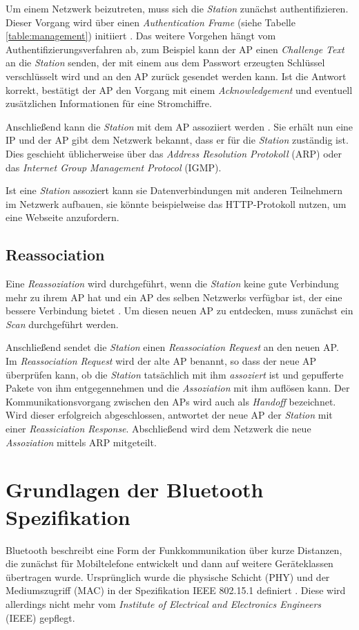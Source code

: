 Um einem Netzwerk beizutreten, muss sich die \emph{Station} zunächst authentifizieren. 
Dieser Vorgang wird über einen \emph{Authentication Frame} (siehe Tabelle \ref{table:management}) initiiert \cite{ieee2012auth}. 
Das weitere Vorgehen hängt vom Authentifizierungsverfahren ab, zum Beispiel kann der AP einen \emph{Challenge Text} an die \emph{Station} senden, der mit einem aus dem Passwort erzeugten Schlüssel verschlüsselt wird und an den AP zurück gesendet werden kann. 
Ist die Antwort korrekt, bestätigt der AP den Vorgang mit einem \emph{Acknowledgement} und eventuell zusätzlichen Informationen für eine Stromchiffre. 

Anschließend kann die \emph{Station} mit dem AP assoziiert werden \cite{ieee2012associate}. 
Sie erhält nun eine IP und der AP gibt dem Netzwerk bekannt, dass er für die \emph{Station} zuständig ist. 
Dies geschieht üblicherweise über das \emph{Address Resolution Protokoll} (ARP) oder das \emph{Internet Group Management Protocol} (IGMP).

Ist eine \emph{Station} assoziert kann sie Datenverbindungen mit anderen Teilnehmern im Netzwerk aufbauen, sie könnte beispielweise das HTTP-Protokoll nutzen, um eine Webseite anzufordern.

\subsection{Reassociation}
Eine \emph{Reassoziation} wird durchgeführt, wenn die \emph{Station} keine gute Verbindung mehr zu ihrem AP hat und ein AP des selben Netzwerks verfügbar ist, der eine bessere Verbindung bietet \cite{ieee2012reassociate}.
Um diesen neuen AP zu entdecken, muss zunächst ein \emph{Scan} durchgeführt werden. 

Anschließend sendet die \emph{Station} einen \emph{Reassociation Request} an den neuen AP. 
Im \emph{Reassociation Request} wird der alte AP benannt, so dass der neue AP überprüfen kann, ob die \emph{Station} tatsächlich mit ihm \emph{assoziert} ist und gepufferte Pakete von ihm entgegennehmen und die \emph{Assoziation} mit ihm auflösen kann.
Der Kommunikationsvorgang zwischen den APs wird auch als \emph{Handoff} bezeichnet. 
Wird dieser erfolgreich abgeschlossen, antwortet der neue AP der \emph{Station} mit einer \emph{Reassiciation Response}.
Abschließend wird dem Netzwerk die neue \emph{Assoziation} mittels ARP mitgeteilt.


\section{Grundlagen der Bluetooth Spezifikation}
Bluetooth beschreibt eine Form der Funkkommunikation über kurze Distanzen, die zunächst für Mobiltelefone entwickelt und dann auf weitere Geräteklassen übertragen wurde.
Ursprünglich wurde die physische Schicht (PHY) und der Mediumszugriff (MAC) in der Spezifikation IEEE 802.15.1 definiert \cite{ieee2002blue}. 
Diese wird allerdings nicht mehr vom \emph{Institute of Electrical and Electronics Engineers} (IEEE) gepflegt. 

